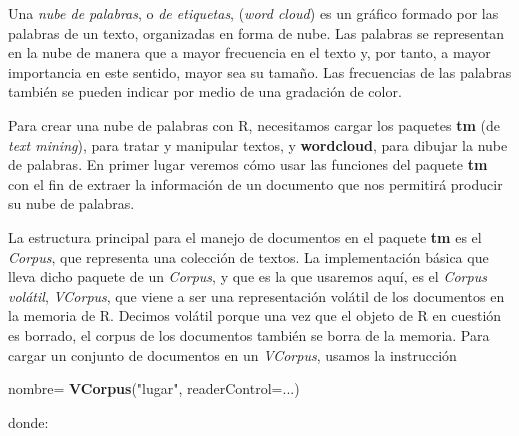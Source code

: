 \documentclass[
]{book}
\newenvironment{Shaded}{\begin{snugshade}}{\end{snugshade}}
\newcommand{\DataTypeTok}[1]{\textcolor[rgb]{0.13,0.29,0.53}{#1}}
\newcommand{\KeywordTok}[1]{\textcolor[rgb]{0.13,0.29,0.53}{\textbf{#1}}}
\newcommand{\NormalTok}[1]{#1}
\newcommand{\StringTok}[1]{\textcolor[rgb]{0.31,0.60,0.02}{#1}}
\theoremstyle{definition}
\theoremstyle{definition}
\theoremstyle{definition}
\theoremstyle{remark}
\begin{document}
Una \emph{nube de palabras}, o \emph{de etiquetas}, (\emph{word cloud}) es un gráfico formado por las palabras de un texto, organizadas en forma de nube. Las palabras se representan en la nube de manera que a mayor frecuencia en el texto y, por tanto, a mayor importancia en este
sentido, mayor sea su tamaño. Las frecuencias de las palabras también se pueden indicar por medio de una gradación de color.

Para crear una nube de palabras con R, necesitamos cargar los paquetes \textbf{tm} (de \emph{text mining}), para tratar y manipular textos, y \textbf{wordcloud}, para dibujar la nube de palabras.
En primer lugar veremos cómo usar las funciones del paquete \textbf{tm} con el fin de extraer la información de un documento que nos permitirá producir su nube de
palabras.

La estructura principal para el manejo de documentos en el paquete \textbf{tm} es el \emph{Corpus}, que representa una colección de textos. La implementación básica que lleva dicho paquete de un \emph{Corpus}, y que es la que usaremos aquí, es el \emph{Corpus volátil}, \emph{VCorpus}, que viene a ser una representación volátil de los documentos en la memoria de R. Decimos volátil porque una vez que el objeto de R en cuestión es borrado, el corpus de los documentos también se borra de la memoria. Para cargar un conjunto de documentos en un \emph{VCorpus}, usamos la instrucción

\begin{Shaded}
\begin{Highlighting}[]
\NormalTok{nombre=}\StringTok{ }\KeywordTok{VCorpus}\NormalTok{(}\StringTok{"lugar"}\NormalTok{, }\DataTypeTok{readerControl=}\NormalTok{...)}
\end{Highlighting}
\end{Shaded}

donde:
\end{document}
